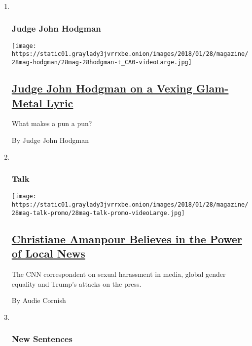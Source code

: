 \begin{enumerate}
\def\labelenumi{\arabic{enumi}.}
\item ~
  \hypertarget{judge-john-hodgman}{%
  \subsubsection{Judge John Hodgman}\label{judge-john-hodgman}}

  \texttt{[image: https://static01.graylady3jvrrxbe.onion/images/2018/01/28/magazine/28mag-hodgman/28mag-28hodgman-t\_CA0-videoLarge.jpg]}

  \hypertarget{judge-john-hodgman-on-a-vexing-glam-metal-lyric}{%
  \subsection{\texorpdfstring{\href{/2018/01/26/magazine/judge-john-hodgman-on-a-vexing-glam-metal-lyric.html}{Judge
  John Hodgman on a Vexing Glam-Metal
  Lyric}}{Judge John Hodgman on a Vexing Glam-Metal Lyric}}\label{judge-john-hodgman-on-a-vexing-glam-metal-lyric}}

  What makes a pun a pun?

  By Judge John Hodgman
\item ~
  \hypertarget{talk}{%
  \subsubsection{Talk}\label{talk}}

  \texttt{[image: https://static01.graylady3jvrrxbe.onion/images/2018/01/28/magazine/28mag-talk-promo/28mag-talk-promo-videoLarge.jpg]}

  \hypertarget{christiane-amanpour-believes-in-the-power-of-local-news}{%
  \subsection{\texorpdfstring{\href{/2018/01/24/magazine/christiane-amanpour-believes-in-the-power-of-local-news.html}{Christiane
  Amanpour Believes in the Power of Local
  News}}{Christiane Amanpour Believes in the Power of Local News}}\label{christiane-amanpour-believes-in-the-power-of-local-news}}

  The CNN correspondent on sexual harassment in media, global gender
  equality and Trump's attacks on the press.

  By Audie Cornish
\item ~
  \hypertarget{new-sentences}{%
  \subsubsection{New Sentences}\label{new-sentences}}


\end{enumerate}

